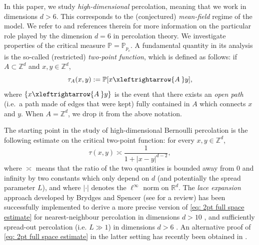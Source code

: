 \documentclass[11pt,a4paper]{article}
\numberwithin{equation}{section}
\theoremstyle{plain}
\theoremstyle{definition}
\newcommand{\connect}{\xleftrightarrow}
\begin{document}
In this paper, we study \emph{high-dimensional} percolation, meaning that we work in dimensions $d>6$. This corresponds to the (conjectured) \emph{mean-field} regime of the model. We refer to \cite{GrimmettPercolation1999,SladeSaintFlourLaceExpansion2006,panis2024applications,hutchcroft2025dimension} and references therein for more information on the particular role played by the dimension $d=6$ in percolation theory. We investigate properties of the critical measure $\mathbb P=\mathbb P_{p_c}$. A fundamental quantity in its analysis is the so-called (restricted) \emph{two-point function}, which is defined as follows: if $A\subset \mathbb Z^d$ and $x,y\in \mathbb Z^d$,
\begin{equation}
	\tau_{A}(x,y):=\mathbb P[x\connect{A\:}y],
\end{equation}
where $\{x\connect{A\:}y\}$ is the event that there exists an \emph{open path} (i.e.\ a path made of edges that were kept) fully contained in $A$ which connects $x$ and $y$. When $A=\mathbb Z^d$, we drop it from the above notation.

The starting point in the study of high-dimensional Bernoulli percolation is the following estimate on the critical two-point function: for every $x,y\in \mathbb Z^d$,
\begin{equation}\tag{$*$}\label{eq: 2pt full space estimate}
	\tau(x,y)\asymp \frac{1}{1+|x-y|^{d-2}},
\end{equation}
where $\asymp$ means that the ratio of the two quantities is bounded away from $0$ and infinity by two constants which only depend on $d$ (and potentially the spread parameter $L$), and where $|\cdot|$ denotes the $\ell^\infty$ norm on $\mathbb R^d$. The \emph{lace expansion} approach developed by Brydges and Spencer \cite{BrydgesSpencerSAW} (see \cite{SladeSaintFlourLaceExpansion2006} for a review) has been successfully implemented to derive a more precise version of \eqref{eq: 2pt full space estimate} for nearest-neighbour percolation in dimensions $d>10$ \cite{HaraSlade1990Perco,HaraDecayOfCorrelationsInVariousModels2008,FitznervdHofstad2017Percod10}, and sufficiently spread-out percolation (i.e. $L\gg 1$) in dimensions $d>6$ \cite{HaraSladevdHofstad2003PercoSO}. An alternative proof of \eqref{eq: 2pt full space estimate} in the latter setting has recently been obtained in \cite{DumPan24Perco}.
\end{document}
